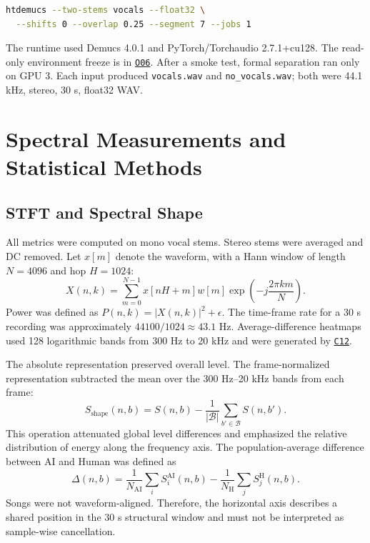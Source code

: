 \documentclass[11pt,a4paper]{article}
\newcommand{\coderef}[1]{\hyperlink{code:#1}{\texttt{#1}}}
\newcommand{\outref}[1]{\hyperlink{output:#1}{\texttt{#1}}}
\begin{document}
\begin{lstlisting}[language=bash,caption={Frozen Demucs vocal-only parameters.}]
htdemucs --two-stems vocals --float32 \
  --shifts 0 --overlap 0.25 --segment 7 --jobs 1
\end{lstlisting}

The runtime used Demucs 4.0.1 and PyTorch/Torchaudio 2.7.1+cu128. The read-only environment freeze is in \outref{O06}. After a smoke test, formal separation ran only on GPU 3. Each input produced \texttt{vocals.wav} and \texttt{no\_vocals.wav}; both were 44.1 kHz, stereo, 30 s, float32 WAV.

\section{Spectral Measurements and Statistical Methods}
\label{sec:method}

\subsection{STFT and Spectral Shape}

All metrics were computed on mono vocal stems. Stereo stems were averaged and DC removed. Let $x[m]$ denote the waveform, with a Hann window of length $N=4096$ and hop $H=1024$:
\begin{equation}
X(n,k)=\sum_{m=0}^{N-1}x[nH+m]w[m]\exp\!\left(-j\frac{2\pi km}{N}\right).
\label{eq:stft}
\end{equation}
Power was defined as $P(n,k)=|X(n,k)|^2+\epsilon$. The time-frame rate for a 30 s recording was approximately $44100/1024\approx43.1$ Hz. Average-difference heatmaps used 128 logarithmic bands from 300 Hz to 20 kHz and were generated by \coderef{C12}.

The absolute representation preserved overall level. The frame-normalized representation subtracted the mean over the 300 Hz--20 kHz bands from each frame:
\begin{equation}
S_{\mathrm{shape}}(n,b)=S(n,b)-\frac{1}{|\mathcal{B}|}\sum_{b'\in\mathcal{B}}S(n,b').
\label{eq:shape}
\end{equation}
This operation attenuated global level differences and emphasized the relative distribution of energy along the frequency axis. The population-average difference between AI and Human was defined as
\begin{equation}
\Delta(n,b)=\frac{1}{N_{\mathrm{AI}}}\sum_i S_i^{\mathrm{AI}}(n,b)
-\frac{1}{N_{\mathrm{H}}}\sum_j S_j^{\mathrm{H}}(n,b).
\label{eq:average-diff}
\end{equation}
Songs were not waveform-aligned. Therefore, the horizontal axis describes a shared position in the 30 s structural window and must not be interpreted as sample-wise cancellation.
\end{document}
